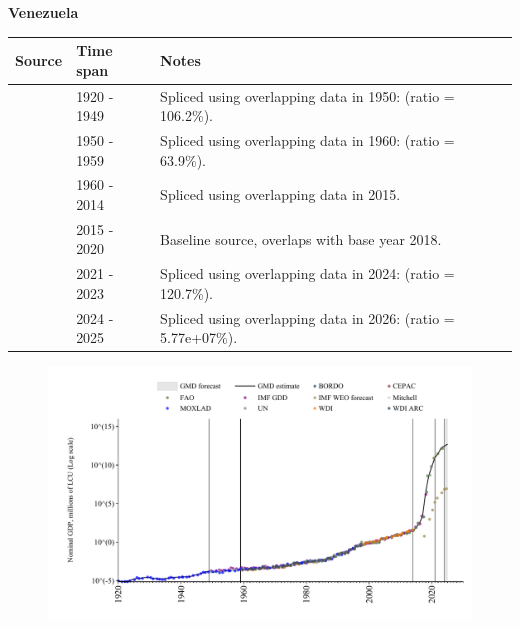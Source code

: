 \documentclass[12pt,a4paper,landscape]{article}
\begin{document}
\begin{adjustbox}{max totalsize={\paperwidth}{\paperheight},center}
\begin{minipage}[t][\textheight][t]{\textwidth}
\vspace*{0.5cm}
{}
\begin{center}
{\Large\bfseries Venezuela}
\end{center}
\vspace{0.5cm}
\begin{table}[H]
\centering
\small
\begin{tabular}{|l|l|l|}
\hline
\textbf{Source} & \textbf{Time span} & \textbf{Notes} \\
\hline
\rowcolor{white}\cite{MOXLAD}& 1920 - 1949 &Spliced using overlapping data in 1950: (ratio = 106.2\%).\\
\rowcolor{lightgray}\cite{IMF_GDD}& 1950 - 1959 &Spliced using overlapping data in 1960: (ratio = 63.9\%).\\
\rowcolor{white}\cite{WDI}& 1960 - 2014 &Spliced using overlapping data in 2015.\\
\rowcolor{lightgray}\cite{UN}& 2015 - 2020 &Baseline source, overlaps with base year 2018.\\
\rowcolor{white}\cite{FAO}& 2021 - 2023 &Spliced using overlapping data in 2024: (ratio = 120.7\%).\\
\rowcolor{lightgray}\cite{IMF_WEO_forecast}& 2024 - 2025 &Spliced using overlapping data in 2026: (ratio = 5.77e+07\%).\\
\hline
\end{tabular}
\end{table}
\begin{figure}[H]
\centering
\includegraphics[width=\textwidth,height=0.6\textheight,keepaspectratio]{graphs/VEN_nGDP.pdf}
\end{figure}
\end{minipage}
\end{adjustbox}
\end{document}
